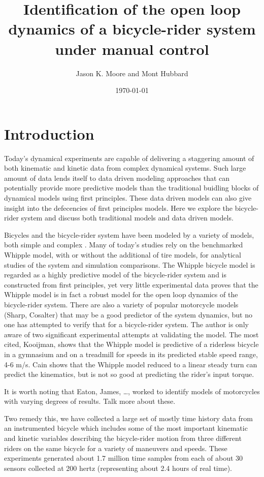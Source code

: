 \documentclass[a4paper]{article}
\title{Identification of the open loop dynamics of a bicycle-rider system
under manual control}
\author{Jason K. Moore and Mont Hubbard}
\date{\today}
\begin{document}
\maketitle

\section{Introduction}

Today's dynamical experiments are capable of delivering a staggering amount of both kinematic and
kinetic data from complex dynamical systems. Such large amount of data lends
itself to data driven modeling approaches that can potentially provide more
predictive models than the traditional buidling blocks of dynamical models using first principles.
These data driven models can also give insight into the defecencies of first
principles models. Here we explore the bicycle-rider system and discuss both
traditional models and data driven models.

Bicycles and the bicycle-rider system have been modeled by a variety of models,
both simple \cite{Timoshenko1948} and complex \cite{Sharp1971}. Many of
today's studies rely on the benchmarked Whipple model, with or without the
additional of tire models, for analytical studies of the system and simulation
comparisons. The Whipple bicycle model is regarded as a highly predictive model
of the bicycle-rider system and is constructed from first principles, yet very
little experimental data proves that the Whipple model is in fact a robust
model for the open loop dynamics of the bicycle-rider system. There are also a
variety of popular motorcycle models (Sharp, Cosalter) that may be a good
predictor of the system dynamics, but no one has attempted to verify that for a
bicycle-rider system. The author is only aware of two significant experimental
attempts at validating the model. The most cited, Kooijman, shows that the
Whipple model is predictive of a riderless bicycle in a gymnasium and on
a treadmill for speeds in its predicted stable speed range, 4-6 m/s. Cain shows
that the Whipple model reduced to a linear steady turn can predict the
kinematics, but is not so good at predicting the rider's input torque.

It is worth noting that Eaton, James, \ldots, worked to identify models of
motorcycles with varying degrees of results. Talk more about these.

Two remedy this, we have collected a large set of mostly time history data from
an instrumented bicycle which includes some of the most important kinematic and
kinetic variables describing the bicycle-rider motion from three different
riders on the same bicycle for a variety of maneuvers and speeds. These
experiments generated about 1.7 million time samples from each of about 30
sensors collected at 200 hertz (representing about 2.4 hours of real time).
\end{document}
